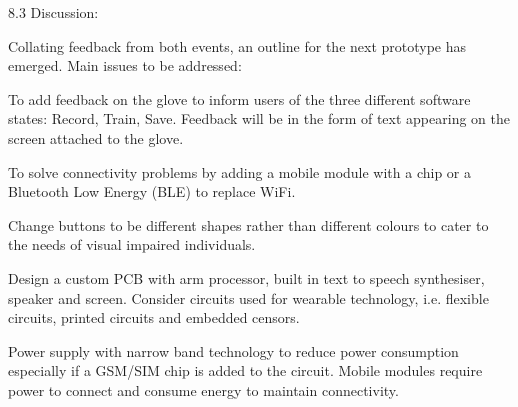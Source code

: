 8.3 Discussion:

Collating feedback from both events, an outline for the next prototype has emerged.  Main issues to be addressed:

To add feedback on the glove to inform users of the three different software states: Record, Train, Save.  Feedback will be in the form of text appearing on the screen attached to the glove. 

To solve connectivity problems by adding a mobile module with a chip or a Bluetooth Low Energy (BLE) to replace WiFi. 

Change buttons to be different shapes rather than different colours to cater to the needs of visual impaired individuals.

Design a custom PCB with arm processor, built in text to speech synthesiser, speaker and screen. Consider circuits used for wearable technology, i.e. flexible circuits, printed circuits and embedded censors. 

Power supply with narrow band technology to reduce power consumption especially if a GSM/SIM chip is added to the circuit.  Mobile modules require power to connect and consume energy to maintain connectivity.  








